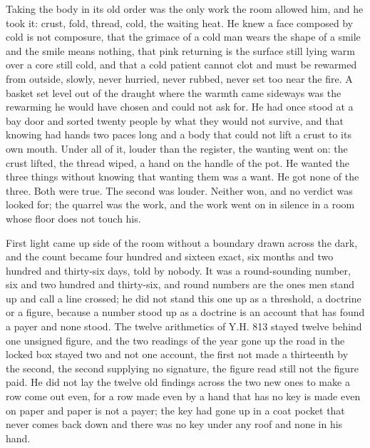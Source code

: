 Taking the body in its old order was the only work the room allowed him, and he took it: crust, fold, thread, cold, the waiting heat. He knew a face composed by cold is not composure, that the grimace of a cold man wears the shape of a smile and the smile means nothing, that pink returning is the surface still lying warm over a core still cold, and that a cold patient cannot clot and must be rewarmed from outside, slowly, never hurried, never rubbed, never set too near the fire. A basket set level out of the draught where the warmth came sideways was the rewarming he would have chosen and could not ask for. He had once stood at a bay door and sorted twenty people by what they would not survive, and that knowing had hands two paces long and a body that could not lift a crust to its own mouth. Under all of it, louder than the register, the wanting went on: the crust lifted, the thread wiped, a hand on the handle of the pot. He wanted the three things without knowing that wanting them was a want. He got none of the three. Both were true. The second was louder. Neither won, and no verdict was looked for; the quarrel was the work, and the work went on in silence in a room whose floor does not touch his.

First light came up  side of the room without a boundary drawn across the dark, and the count became four hundred and sixteen exact, six months and two hundred and thirty-six days, told by nobody. It was a round-sounding number, six and two hundred and thirty-six, and round numbers are the ones men stand up and call a line crossed; he did not stand this one up as a threshold, a doctrine or a figure, because a number stood up as a doctrine is an account that has found a payer and none stood. The twelve arithmetics of Y.H. 813 stayed twelve behind one unsigned figure, and the two readings of the year gone up the road in the locked box stayed two and not one account, the first not made a thirteenth by the second, the second supplying no signature, the figure read still not the figure paid. He did not lay the twelve old findings across the two new ones to make a row come out even, for a row made even by a hand that has no key is made even on paper and paper is not a payer; the key had gone up in a coat pocket that never comes back down and there was no key under any roof and none in his hand.

